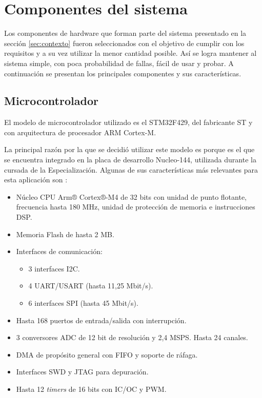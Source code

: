 \section{Componentes del sistema}

Los componentes de hardware que forman parte del sistema presentado en la sección \ref{sec:contexto} fueron seleccionados con el objetivo de cumplir con los requisitos y a su vez utilizar la menor cantidad posible. Así se logra mantener al sistema simple, con poca probabilidad de fallas, fácil de usar y probar. A continuación se presentan los principales componentes y sus características.

\subsection{Microcontrolador}

El modelo de microcontrolador utilizado es el STM32F429, del fabricante ST y con arquitectura de procesador ARM Cortex-M.

La principal razón por la que se decidió utilizar este modelo es porque es el que se encuentra integrado en la placa de desarrollo Nucleo-144, utilizada durante la cursada de la Especialización. Algunas de sus características más relevantes para esta aplicación son \citep{STM32F429}:

\begin{itemize}
\item Núcleo CPU Arm® Cortex®-M4 de 32 bits con unidad de punto flotante, frecuencia hasta 180 MHz, unidad de protección de memoria e instrucciones DSP.
\item Memoria Flash de hasta 2 MB.
\item Interfaces de comunicación:
	\begin{itemize}
	\item 3 interfaces I2C.
	\item 4 UART/USART (hasta 11,25 Mbit/s).
	\item 6 interfaces SPI (hasta 45 Mbit/s).
	\end{itemize}
\item Hasta 168 puertos de entrada/salida con interrupción.
\item 3 conversores ADC de 12 bit de resolución y 2,4 MSPS. Hasta 24 canales.
\item DMA de propósito general con FIFO y soporte de ráfaga.
\item Interfaces SWD y JTAG para depuración.
\item Hasta 12 \textit{timers} de 16 bits con IC/OC y PWM.
\end{itemize}

